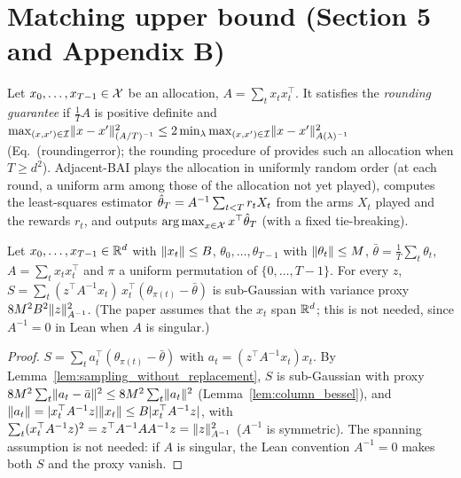 \chapter{Matching upper bound (Section 5 and Appendix B)}
\label{chap:upper_bound}

\begin{definition}
  \label{def:adjacent_bai}
  \leanok
  Let $x_0, \dots, x_{T-1} \in \mathcal{X}$ be an allocation, $A = \sum_{t} x_t x_t^\top$. It satisfies the
  \emph{rounding guarantee} if $\frac1T A$ is positive definite and
  $\max_{(x, x') \in \mathcal{I}} \lVert x - x' \rVert^2_{(A/T)^{-1}} \le 2 \min_\lambda \max_{(x, x') \in \mathcal{I}}
  \lVert x - x' \rVert^2_{A(\lambda)^{-1}}$ (Eq.~(roundingerror); the rounding procedure of
  \cite{pukelsheim2006optimal} provides such an allocation when $T \ge d^2$). Adjacent-BAI plays the
  allocation in uniformly random order (at each round, a uniform arm among those of the allocation
  not yet played), computes the least-squares estimator
  $\hat{\theta}_T = A^{-1} \sum_{t < T} r_t X_t$ from the arms $X_t$ played and the rewards $r_t$, and
  outputs $\operatorname*{arg\,max}_{x \in \mathcal{X}} x^\top \hat{\theta}_T$ (with a fixed tie-breaking).
\end{definition}

\begin{lemma}
  \label{lem:perm_subgaussian}
  \leanok
  Let $x_0, \dots, x_{T-1} \in \mathbb{R}^d$ with $\lVert x_t \rVert \le B$, $\theta_0, \dots, \theta_{T-1}$ with
  $\lVert \theta_t \rVert \le M$, $\bar\theta = \frac1T \sum_t \theta_t$, $A = \sum_t x_t x_t^\top$ and $\pi$
  a uniform permutation of $\{0, \dots, T - 1\}$. For every $z$,
  $S = \sum_t (z^\top A^{-1} x_t) \, x_t^\top (\theta_{\pi(t)} - \bar\theta)$ is sub-Gaussian with
  variance proxy $8 M^2 B^2 \lVert z \rVert^2_{A^{-1}}$. (The paper assumes that the $x_t$ span $\mathbb{R}^d$;
  this is not needed, since $A^{-1} = 0$ in Lean when $A$ is singular.)
\end{lemma}

\begin{proof}
  \leanok
  $S = \sum_t a_t^\top (\theta_{\pi(t)} - \bar\theta)$ with $a_t = (z^\top A^{-1} x_t) x_t$. By
  Lemma~\ref{lem:sampling_without_replacement}, $S$ is sub-Gaussian with proxy
  $8M^2 \sum_t \lVert a_t - \bar a \rVert^2 \le 8M^2 \sum_t \lVert a_t \rVert^2$
  (Lemma~\ref{lem:column_bessel}), and
  $\lVert a_t \rVert = \lvert x_t^\top A^{-1} z \rvert \lVert x_t \rVert \le B \lvert x_t^\top A^{-1} z \rvert$, with
  $\sum_t (x_t^\top A^{-1} z)^2 = z^\top A^{-1} A A^{-1} z = \lVert z \rVert^2_{A^{-1}}$ ($A^{-1}$ is
  symmetric). The spanning assumption is not needed: if $A$ is singular, the Lean convention
  $A^{-1} = 0$ makes both $S$ and the proxy vanish.
\end{proof}

